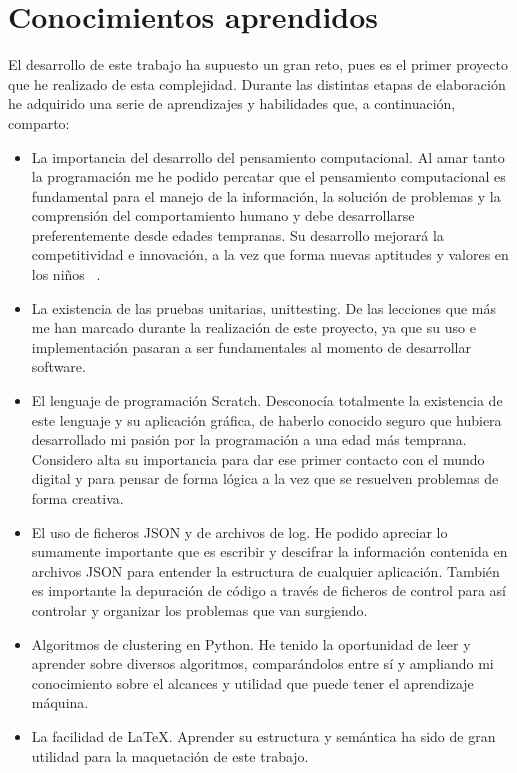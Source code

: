 \documentclass[a4paper, 12pt]{book}
\begin{document}
\section{Conocimientos aprendidos}
\label{sec:aprendizaje}

El desarrollo de este trabajo ha supuesto un gran reto, pues es el primer proyecto que he realizado de esta complejidad. Durante las distintas etapas de elaboración he adquirido una serie de aprendizajes y habilidades que, a continuación, comparto:

\begin{itemize}
\item La importancia del desarrollo del pensamiento computacional. Al amar tanto la programación me he podido percatar que el pensamiento computacional es fundamental para el manejo de la información, la solución de problemas y la comprensión del comportamiento humano y debe desarrollarse preferentemente desde edades tempranas. Su desarrollo mejorará la competitividad e innovación, a la vez que forma nuevas aptitudes y valores en los niños~ \cite{wing_socialissues}.
\item La existencia de las pruebas unitarias, unittesting. De las lecciones que más me han marcado durante la realización de este proyecto, ya que su uso e implementación pasaran a ser fundamentales al momento de desarrollar software.
\item El lenguaje de programación Scratch. Desconocía totalmente la existencia de este lenguaje y su aplicación gráfica, de haberlo conocido seguro que hubiera desarrollado mi pasión por la programación a una edad más temprana. Considero alta su importancia para dar ese primer contacto con el mundo digital y para pensar de forma lógica a la vez que se resuelven problemas de forma creativa.
\item El uso de ficheros JSON y de archivos de log. He podido apreciar lo sumamente importante que es escribir y descifrar la información contenida en archivos JSON para entender la estructura de cualquier aplicación. También es importante la depuración de código a través de ficheros de control para así controlar y organizar los problemas que van surgiendo.  
\item Algoritmos de clustering en Python. He tenido la oportunidad de leer y aprender sobre diversos algoritmos, comparándolos entre sí y ampliando mi conocimiento sobre el alcances y utilidad que puede tener el aprendizaje máquina. 
\item La facilidad de \LaTeX. Aprender su estructura y semántica ha sido de gran utilidad para la maquetación de este trabajo.
\end{itemize}
\end{document}
